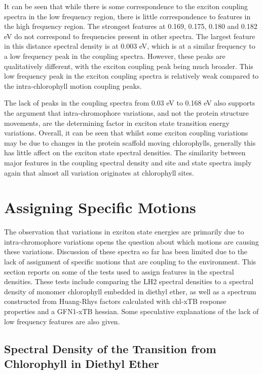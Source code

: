 It can be seen that while there is some correspondence to the exciton coupling spectra 
in the low frequency region, there is little correspondence to features in the high
frequency region. The strongest features at 0.169, 0.175, 0.180 and 0.182 eV do
not correspond to frequencies present in other spectra. The largest feature in
this distance spectral density is at 0.003 eV, which is at a similar frequency to a
low frequency peak in the coupling spectra. However, these peaks are qualitatively 
different, with the exciton coupling peak being much broader. This low frequency
peak in the exciton coupling spectra is relatively weak compared to the intra-chlorophyll
motion coupling peaks.

The lack of peaks in the coupling spectra from 0.03 eV to 0.168 eV also supports
the argument that intra-chromophore variations, and not the protein structure movements,
are the determining factor in exciton state transition energy variations. Overall,
it can be seen that whilst some exciton coupling variations may be due to changes 
in the protein scaffold moving chlorophylls, generally this has little affect on
the exciton state spectral densities. The similarity between major features in the
coupling spectral density and site and state spectra imply again that almost all
variation originates at chlorophyll sites.

\afterpartskip
\section{Assigning Specific Motions}
\label{sec:monomer_dimer_assign}

The observation that variations in exciton state energies are primarily due to intra-chromophore 
variations opens the question about which motions are causing these variations. Discussion
of these spectra so far has been limited due to the lack of assignment of specific
motions that are coupling to the environment. This section reports on some of the
tests used to assign features in the spectral densities. These tests include comparing
the LH2 spectral densities to a spectral density of monomer chlorophyll embedded
in diethyl ether, as well as a spectrum constructed from Huang-Rhys factors calculated
with chl-xTB response properties and a GFN1-xTB hessian. Some speculative explanations
of the lack of low frequency features are also given.

\subsection{Spectral Density of the \Qy Transition from Chlorophyll in Diethyl Ether}
\label{subsec:specdens_ether}

